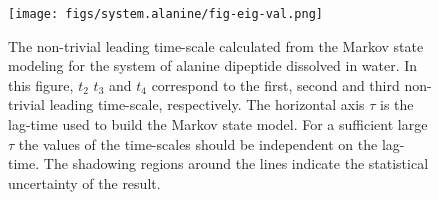 \documentclass[epjST]{svjour}
\newcommand{\vect}[1]{\textbf{\textit{#1}}}
\begin{document}



\begin{figure}
  \centering
  \texttt{[image: figs/system.alanine/fig-eig-val.png]}
  \caption{The non-trivial leading time-scale calculated from the
    Markov state modeling for the system of alanine dipeptide
    dissolved in water. In this figure, $t_2$ $t_3$ and $t_4$
    correspond to the first, second and third non-trivial leading
    time-scale, respectively. The horizontal axis $\tau$ is the
    lag-time used to build the Markov state model. For a sufficient
    large $\tau$ the values of the time-scales should be independent on
    the lag-time. The shadowing regions around the lines indicate the
    statistical uncertainty of the result. }
  \label{fig:ala-msm-t}
\end{figure}
\end{document}
